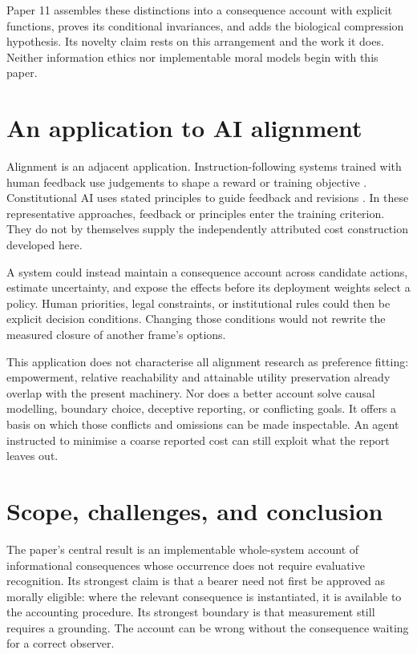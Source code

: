 \documentclass[11pt,a4paper]{article}
\theoremstyle{remark}
\begin{document}
Paper 11 assembles these distinctions into a consequence account with explicit
functions, proves its conditional invariances, and adds the biological
compression hypothesis. Its novelty claim rests on this arrangement and the
work it does. Neither information ethics nor implementable moral models begin
with this paper.

\section{An application to AI alignment}\label{sec:alignment}

Alignment is an adjacent application. Instruction-following systems trained
with human feedback use judgements to shape a reward or training objective
\citep{ouyang2022feedback}. Constitutional AI uses stated principles to guide
feedback and revisions \citep{bai2022constitutional}. In these representative
approaches, feedback or principles enter the training criterion. They do not
by themselves supply the independently attributed cost construction developed
here.

A system could instead maintain a consequence account across candidate actions,
estimate uncertainty, and expose the effects before its deployment weights
select a policy. Human priorities, legal constraints, or institutional rules
could then be explicit decision conditions. Changing those conditions would not
rewrite the measured closure of another frame's options.

This application does not characterise all alignment research as preference
fitting: empowerment, relative reachability and attainable utility preservation
already overlap with the present machinery. Nor does a better account solve
causal modelling, boundary choice, deceptive reporting, or conflicting goals.
It offers a basis on which those conflicts and omissions can be made inspectable.
An agent instructed to minimise a coarse reported cost can still exploit what
the report leaves out.

\section{Scope, challenges, and conclusion}\label{sec:conclusion}

The paper's central result is an implementable whole-system account of
informational consequences whose occurrence does not require evaluative
recognition. Its strongest claim is that a bearer
need not first be approved as morally eligible: where the relevant consequence
is instantiated, it is available to the accounting procedure. Its strongest
boundary is that measurement still requires a grounding. The account can be
wrong without the consequence waiting for a correct observer.
\end{document}

